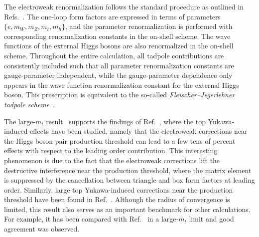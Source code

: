 The electroweak renormalization follows the standard procedure as outlined in Refs.~\cite{Denner:1991kt,Denner:2019vbn}. 
%
The one-loop form factors are expressed in terms of parameters $\{e,m_W,m_Z,m_t,m_h\}$, and the parameter renormalization is performed with corresponding renormalization constants in the on-shell scheme.
%
The wave functions of the external Higgs bosons are also renormalized in the on-shell scheme.
%
Throughout the entire calculation, all tadpole contributions are consistently included such that all parameter renormalization constants are gauge-parameter independent, while the gauge-parameter dependence only appears in the wave function renormalization constant for the external Higgs boson.
%
This prescription is equivalent to the so-called \textit{Fleischer--Jegerlehner tadpole scheme}~\cite{Fleischer:1980ub}.
%

The large-$m_t$ result~\cite{Davies:2023npk} supports the findings of Ref.~\cite{Muhlleitner:2022ijf},
where the top Yukawa-induced effects have been studied, namely that the electroweak corrections near the Higgs boson pair production threshold can lead to a few tens of percent effects with respect to the leading order contribution.
%
This interesting phenomenon is due to the fact that the electroweak corrections lift the destructive interference near the production threshold, where the matrix element is suppressed by the cancellation between triangle and box form factors at leading order.
Similarly, large top Yukawa-induced corrections near the production threshold have been found in Ref.~\cite{Heinrich:2024dnz}.
%
Although the radius of convergence is
limited, this result also serves as an important benchmark for other calculations. 
For example, it has been compared with Ref.~\cite{Bi:2023bnq} in a large-$m_t$ limit and good agreement was observed.

